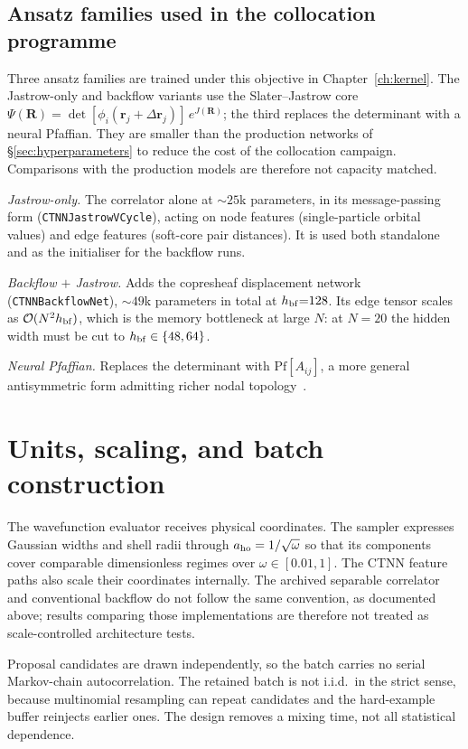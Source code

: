 \subsection{Ansatz families used in the collocation programme}
\label{subsec:colloc-families}
Three ansatz families are trained under this objective in Chapter~\ref{ch:kernel}. The
Jastrow-only and backflow variants use the Slater--Jastrow core
$\Psi(\mathbf R)=\det[\phi_i(\mathbf r_j+\Delta\mathbf r_j)]\,e^{J(\mathbf R)}$; the third
replaces the determinant with a neural Pfaffian. They are smaller than the production networks of
\S\ref{sec:hyperparameters} to reduce the cost of the collocation campaign. Comparisons with
the production models are therefore not capacity matched.

\emph{Jastrow-only.} The correlator alone at ${\sim}25$k parameters, in its
message-passing form (\texttt{CTNN\-Jastrow\-VCycle}), acting on node features
(single-particle orbital values) and edge features (soft-core pair distances). It is used
both standalone and as the initialiser for the backflow runs.

\emph{Backflow $+$ Jastrow.} Adds the copresheaf displacement network
(\texttt{CTNNBackflowNet}), ${\sim}49$k parameters in total at $h_{\rm bf}{=}128$. Its edge
tensor scales as $\mathcal O(N^2 h_{\rm bf})$, which is the memory bottleneck at large $N$:
at $N{=}20$ the hidden width must be cut to $h_{\rm bf}\in\{48,64\}$.

\emph{Neural Pfaffian.} Replaces the determinant with $\mathrm{Pf}[A_{ij}]$, a more general
antisymmetric form admitting richer nodal topology~\cite{GaoGuennemann2024-NeuralPfaffian}.

\section{Units, scaling, and batch construction}
\label{sec:units-scaling}

The wavefunction evaluator receives physical coordinates. The sampler expresses Gaussian
widths and shell radii through $a_{\rm ho}=1/\sqrt{\omega}$ so that its components cover
comparable dimensionless regimes over $\omega\in[0.01,1]$. The CTNN feature paths also
scale their coordinates internally. The archived separable correlator and conventional
backflow do not follow the same convention, as documented above; results comparing those
implementations are therefore not treated as scale-controlled architecture tests.

Proposal candidates are drawn independently, so the batch carries no serial Markov-chain
autocorrelation. The retained batch is not i.i.d.\ in the strict sense, because multinomial
resampling can repeat candidates and the hard-example buffer reinjects earlier ones. The
design removes a mixing time, not all statistical dependence.

